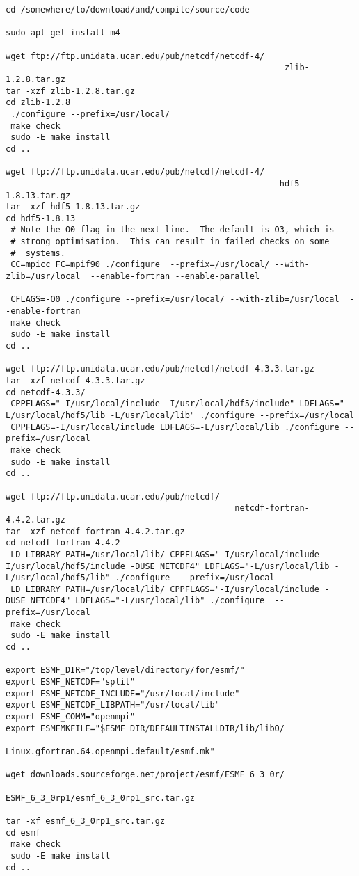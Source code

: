 \documentclass[12pt]{article}
\begin{document}
\begin{lstlisting}
cd /somewhere/to/download/and/compile/source/code

sudo apt-get install m4

wget ftp://ftp.unidata.ucar.edu/pub/netcdf/netcdf-4/
                                                        zlib-1.2.8.tar.gz
tar -xzf zlib-1.2.8.tar.gz 
cd zlib-1.2.8
 ./configure --prefix=/usr/local/
 make check
 sudo -E make install
cd ..

wget ftp://ftp.unidata.ucar.edu/pub/netcdf/netcdf-4/
                                                       hdf5-1.8.13.tar.gz	
tar -xzf hdf5-1.8.13.tar.gz 
cd hdf5-1.8.13
 # Note the O0 flag in the next line.  The default is O3, which is
 # strong optimisation.  This can result in failed checks on some
 #  systems.
 CC=mpicc FC=mpif90 ./configure  --prefix=/usr/local/ --with-zlib=/usr/local  --enable-fortran --enable-parallel

 CFLAGS=-O0 ./configure --prefix=/usr/local/ --with-zlib=/usr/local  --enable-fortran 
 make check
 sudo -E make install
cd ..

wget ftp://ftp.unidata.ucar.edu/pub/netcdf/netcdf-4.3.3.tar.gz
tar -xzf netcdf-4.3.3.tar.gz 
cd netcdf-4.3.3/
 CPPFLAGS="-I/usr/local/include -I/usr/local/hdf5/include" LDFLAGS="-L/usr/local/hdf5/lib -L/usr/local/lib" ./configure --prefix=/usr/local 
 CPPFLAGS=-I/usr/local/include LDFLAGS=-L/usr/local/lib ./configure --prefix=/usr/local 
 make check
 sudo -E make install
cd ..

wget ftp://ftp.unidata.ucar.edu/pub/netcdf/
                                              netcdf-fortran-4.4.2.tar.gz
tar -xzf netcdf-fortran-4.4.2.tar.gz 
cd netcdf-fortran-4.4.2
 LD_LIBRARY_PATH=/usr/local/lib/ CPPFLAGS="-I/usr/local/include  -I/usr/local/hdf5/include -DUSE_NETCDF4" LDFLAGS="-L/usr/local/lib -L/usr/local/hdf5/lib" ./configure  --prefix=/usr/local
 LD_LIBRARY_PATH=/usr/local/lib/ CPPFLAGS="-I/usr/local/include -DUSE_NETCDF4" LDFLAGS="-L/usr/local/lib" ./configure  --prefix=/usr/local
 make check
 sudo -E make install
cd ..

export ESMF_DIR="/top/level/directory/for/esmf/"
export ESMF_NETCDF="split"
export ESMF_NETCDF_INCLUDE="/usr/local/include"
export ESMF_NETCDF_LIBPATH="/usr/local/lib"
export ESMF_COMM="openmpi"
export ESMFMKFILE="$ESMF_DIR/DEFAULTINSTALLDIR/lib/libO/
                             Linux.gfortran.64.openmpi.default/esmf.mk"
                                                                                                              
wget downloads.sourceforge.net/project/esmf/ESMF_6_3_0r/
                                 ESMF_6_3_0rp1/esmf_6_3_0rp1_src.tar.gz
                                                                                                              
tar -xf esmf_6_3_0rp1_src.tar.gz
cd esmf 
 make check
 sudo -E make install
cd ..

\end{lstlisting}
\end{document}
